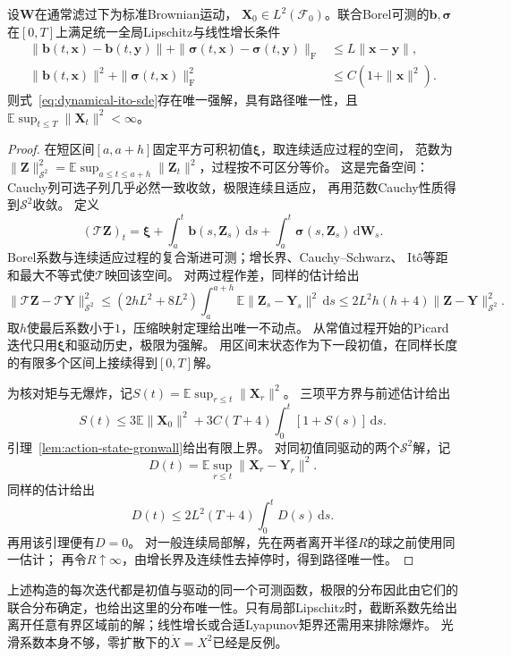 \begin{theorem}[SDE强解的存在唯一性]
 \label{thm:dynamical-sde-strong-existence}
 设$\bm W$在通常滤过下为标准Brownian运动，
 $\bm X_0\in L^2(\mathcal F_0)$。联合Borel可测的$\bm b,\bm\sigma$
 在$[0,T]$上满足统一全局Lipschitz与线性增长条件
 \begin{align*}
 \|\bm b(t,\bm x)-\bm b(t,\bm y)\|
 +\|\bm\sigma(t,\bm x)-\bm\sigma(t,\bm y)\|_{\mathrm F}
    &\leq L\|\bm x-\bm y\|,\\
 \|\bm b(t,\bm x)\|^2+\|\bm\sigma(t,\bm x)\|_{\mathrm F}^2
    &\leq C(1+\|\bm x\|^2).
 \end{align*}
 则式~\eqref{eq:dynamical-ito-sde}存在唯一强解，具有路径唯一性，且
 $\mathbb E\sup_{t\leq T}\|\bm X_t\|^2<\infty$。
\end{theorem}
\begin{proof}
 在短区间$[a,a+h]$固定平方可积初值$\bm\xi$，取连续适应过程的空间，
 范数为$\|\bm Z\|_{\mathcal S^2}^2
 =\mathbb E\sup_{a\leq t\leq a+h}\|\bm Z_t\|^2$，过程按不可区分等价。
 这是完备空间：Cauchy列可选子列几乎必然一致收敛，极限连续且适应，
 再用范数Cauchy性质得到$\mathcal S^2$收敛。
 定义
 \[
  (\mathcal T\bm Z)_t=\bm\xi+\int_a^t\bm b(s,\bm Z_s)\,\mathrm ds
                         +\int_a^t\bm\sigma(s,\bm Z_s)\,\mathrm d\bm W_s.
 \]
 Borel系数与连续适应过程的复合渐进可测；增长界、Cauchy--Schwarz、
 Itô等距和最大不等式使$\mathcal T$映回该空间。
 对两过程作差，同样的估计给出
 \[
 \|\mathcal T\bm Z-\mathcal T\bm Y\|_{\mathcal S^2}^2
 \leq(2hL^2+8L^2)\int_a^{a+h}
                   \mathbb E\|\bm Z_s-\bm Y_s\|^2\,\mathrm ds
 \leq2L^2h(h+4)\|\bm Z-\bm Y\|_{\mathcal S^2}^2.
 \]
 取$h$使最后系数小于$1$，压缩映射定理给出唯一不动点。
 从常值过程开始的Picard迭代只用$\bm\xi$和驱动历史，极限为强解。
 用区间末状态作为下一段初值，在同样长度的有限多个区间上接续得到$[0,T]$解。

 为核对矩与无爆炸，记$S(t)=\mathbb E\sup_{r\leq t}\|\bm X_r\|^2$。
 三项平方界与前述估计给出
 \[
  S(t)\leq3\mathbb E\|\bm X_0\|^2
       +3C(T+4)\int_0^t[1+S(s)]\,\mathrm ds.
 \]
 引理~\ref{lem:action-state-gronwall}给出有限上界。
 对同初值同驱动的两个$\mathcal S^2$解，记
 \[
  D(t)=\mathbb E\sup_{r\leq t}\|\bm X_r-\bm Y_r\|^2.
 \]
 同样的估计给出
 \[
  D(t)\leq2L^2(T+4)\int_0^tD(s)\,\mathrm ds.
 \]
 再用该引理便有$D=0$。
 对一般连续局部解，先在两者离开半径$R$的球之前使用同一估计；
 再令$R\uparrow\infty$，由增长界及连续性去掉停时，得到路径唯一性。
\end{proof}

上述构造的每次迭代都是初值与驱动的同一个可测函数，极限的分布因此由它们的
联合分布确定，也给出这里的分布唯一性。只有局部Lipschitz时，截断系数先给出
离开任意有界区域前的解；线性增长或合适Lyapunov矩界还需用来排除爆炸。
光滑系数本身不够，零扩散下的$\dot X=X^2$已经是反例。

